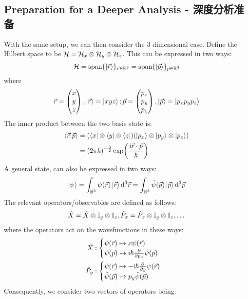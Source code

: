 \subsection{Preparation for a Deeper Analysis - 深度分析准备}
With the same setup, we can then consider the 3 dimensional case. Define the Hilbert space to be $\mathcal{H} = \mathcal{H}_x \otimes \mathcal{H}_y \otimes \mathcal{H}_z$. This can be expressed in two ways:
$$\mathcal{H} = \text{span}\{\ket{\vec{r}}\}_{\vec{r} \in \mathbb{R}^3} = \text{span}\{\ket{\vec{p}}\}_{\vec{p} \in \mathbb{R}^3}$$
where
$$\vec{r} = \begin{pmatrix}
    x \\ y \\ z
\end{pmatrix}, \ket{\vec{r}} = \ket{xyz}; \vec{p} = \begin{pmatrix}
    p_x \\ p_y \\ p_z
\end{pmatrix}, \ket{\vec{p}} = \ket{p_xp_yp_z}$$
The inner product between the two basis state is:
\begin{align*}
    \braket{\vec{r}}{\vec{p}} &= (\bra{x} \otimes \bra{y} \otimes \bra{z})(\ket{p_x} \otimes \ket{p_y} \otimes \ket{p_z}) \\
    &= (2\pi\hbar)^{-\frac{3}{2}} \exp(\frac{\mathrm{i} \vec{r} \cdot \vec{p}}{\hbar})
\end{align*}
A general state, can also be expressed in two ways:
$$\ket{\psi} = \int_{\mathbb{R}^3} \psi(\vec{r})\ket{\vec{r}} \dd^3 \vec{r} = \int_{\mathbb{R}^3} \tilde{\psi}(\vec{p})\ket{\vec{p}}\dd^3 \vec{p}$$
The relevant operators/observables are defined as follows:
$$\hat{X} = \hat{X} \otimes \mathbb{I}_y \otimes \mathbb{I}_z, \hat{P}_x = \hat{P}_x \otimes \mathbb{I}_y \otimes \mathbb{I}_z, \dots$$
where the operators act on the wavefunctions in these ways:
\begin{align*}
    \hat{X}&: \begin{cases}
        \psi(\vec{r}) \mapsto x\psi(\vec{r}) \\
        \tilde{\psi}(\vec{p}) \mapsto \mathrm{i} \hbar \pdv{p_x}\tilde{\psi}(\vec{p})
    \end{cases} \\
    \hat{P}_y&: \begin{cases}
        \psi(\vec{r}) \mapsto -\mathrm{i} \hbar \pdv{y}\psi(\vec{r}) \\
        \tilde{\psi}(\vec{p}) \mapsto p_y\tilde{\psi}(\vec{p})
    \end{cases}
\end{align*}
Consequently, we consider two vectors of operators being:
